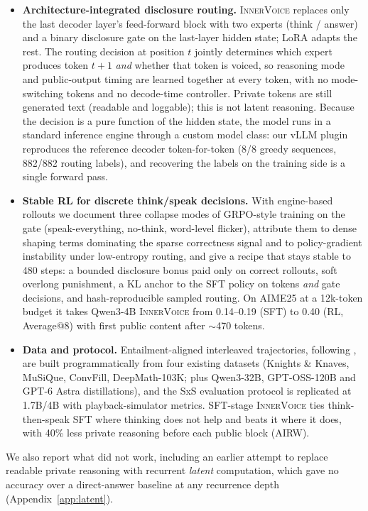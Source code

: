 \documentclass[letterpaper]{article} %
\newcommand{\iv}{\textsc{InnerVoice}}
\begin{document}
\begin{itemize}
\item \textbf{Architecture-integrated disclosure routing.} \iv{} replaces only the last decoder layer's feed-forward block with two experts (think / answer) and a binary disclosure gate on the last-layer hidden state; LoRA adapts the rest. The routing decision at position $t$ jointly determines which expert produces token $t{+}1$ \emph{and} whether that token is voiced, so reasoning mode and public-output timing are learned together at every token, with no mode-switching tokens and no decode-time controller. Private tokens are still generated text (readable and loggable); this is not latent reasoning. Because the decision is a pure function of the hidden state, the model runs in a standard inference engine through a custom model class: our vLLM plugin reproduces the reference decoder token-for-token (8/8 greedy sequences, 882/882 routing labels), and recovering the labels on the training side is a single forward pass.
\item \textbf{Stable RL for discrete think/speak decisions.} With engine-based rollouts we document three collapse modes of GRPO-style training on the gate (speak-everything, no-think, word-level flicker), attribute them to dense shaping terms dominating the sparse correctness signal and to policy-gradient instability under low-entropy routing, and give a recipe that stays stable to 480 steps: a bounded disclosure bonus paid only on correct rollouts, soft overlong punishment, a KL anchor to the SFT policy on tokens \emph{and} gate decisions, and hash-reproducible sampled routing. On AIME25 at a 12k-token budget it takes Qwen3-4B \iv{} from 0.14--0.19 (SFT) to 0.40 (RL, Average@8) with first public content after $\sim$470 tokens.
\item \textbf{Data and protocol.} Entailment-aligned interleaved trajectories, following \citet{wei2026sxs}, are built programmatically from four existing datasets (Knights \& Knaves, MuSiQue, ConvFill, DeepMath-103K; plus Qwen3-32B, GPT-OSS-120B and GPT-6 Astra distillations), and the SxS evaluation protocol is replicated at 1.7B/4B with playback-simulator metrics. SFT-stage \iv{} ties think-then-speak SFT where thinking does not help and beats it where it does, with 40\% less private reasoning before each public block (AIRW).
\end{itemize}
We also report what did not work, including an earlier attempt to replace readable private reasoning with recurrent \emph{latent} computation, which gave no accuracy over a direct-answer baseline at any recurrence depth (Appendix~\ref{app:latent}).
\end{document}
